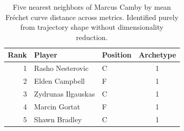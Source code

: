 \begin{table}[htbp]
  \centering\small
  \begin{tabular}{rllc}
    \toprule
    Rank & Player & Position & Archetype \\
    \midrule
    1 & Rasho Nesterovic & C & 1 \\
    2 & Elden Campbell & F & 1 \\
    3 & Zydrunas Ilgauskas & C & 1 \\
    4 & Marcin Gortat & F & 1 \\
    5 & Shawn Bradley & C & 1 \\
    \bottomrule
  \end{tabular}
  \caption{Five nearest neighbors of Marcus Camby by mean Fr\'{e}chet curve distance across metrics. Identified purely from trajectory shape without dimensionality reduction.}
  \label{tab:Marcus_Camby_frechet_curve_neighbors}
\end{table}


